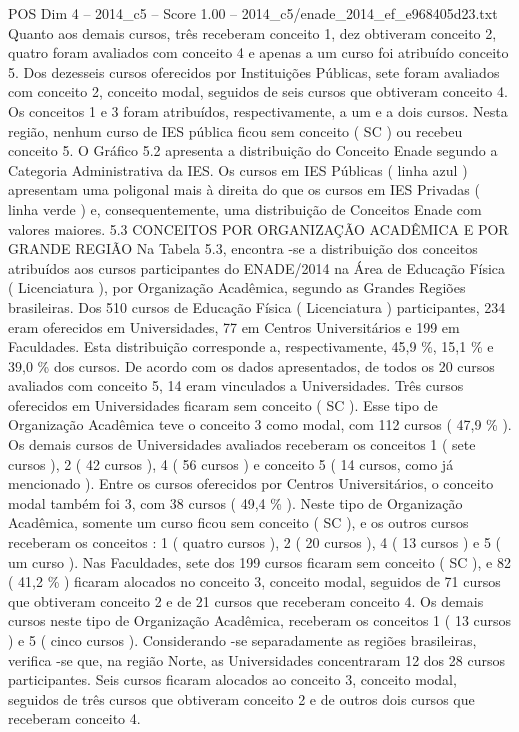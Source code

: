 \begin{textsample}{POS Dim 4 – 2014\_c5 – Score 1.00 – 2014\_c5/enade\_2014\_ef\_e968405d23.txt}
Quanto aos demais cursos, três receberam conceito 1, dez obtiveram conceito 2, quatro foram avaliados com conceito 4 e apenas a um curso foi atribuído conceito 5.
Dos dezesseis cursos oferecidos por Instituições Públicas, sete foram avaliados com conceito 2, conceito modal, seguidos de seis cursos que obtiveram conceito 4.
Os conceitos 1 e 3 foram atribuídos, respectivamente, a um e a dois cursos.
Nesta região, nenhum curso de IES pública ficou sem conceito ( SC ) ou recebeu conceito 5.
O Gráfico 5.2 apresenta a distribuição do Conceito Enade segundo a Categoria Administrativa da IES.
Os cursos em IES Públicas ( linha azul ) apresentam uma poligonal mais à direita do que os cursos em IES Privadas ( linha verde ) e, consequentemente, uma distribuição de Conceitos Enade com valores maiores. 5.3 CONCEITOS POR ORGANIZAÇÃO ACADÊMICA E POR GRANDE REGIÃO Na Tabela 5.3, encontra -se a distribuição dos conceitos atribuídos aos cursos participantes do ENADE/2014 na Área de Educação Física ( Licenciatura ), por Organização Acadêmica, segundo as Grandes Regiões brasileiras.
Dos 510 cursos de Educação Física ( Licenciatura ) participantes, 234 eram oferecidos em Universidades, 77 em Centros Universitários e 199 em Faculdades.
Esta distribuição corresponde a, respectivamente, 45,9 \%, 15,1 \% e 39,0 \% dos cursos.
De acordo com os dados apresentados, de todos os 20 cursos avaliados com conceito 5, 14 eram vinculados a Universidades.
Três cursos oferecidos em Universidades ficaram sem conceito ( SC ).
Esse tipo de Organização Acadêmica teve o conceito 3 como modal, com 112 cursos ( 47,9 \% ).
Os demais cursos de Universidades avaliados receberam os conceitos 1 ( sete cursos ), 2 ( 42 cursos ), 4 ( 56 cursos ) e conceito 5 ( 14 cursos, como já mencionado ).
Entre os cursos oferecidos por Centros Universitários, o conceito modal também foi 3, com 38 cursos ( 49,4 \% ).
Neste tipo de Organização Acadêmica, somente um curso ficou sem conceito ( SC ), e os outros cursos receberam os conceitos : 1 ( quatro cursos ), 2 ( 20 cursos ), 4 ( 13 cursos ) e 5 ( um curso ).
Nas Faculdades, sete dos 199 cursos ficaram sem conceito ( SC ), e 82 ( 41,2 \% ) ficaram alocados no conceito 3, conceito modal, seguidos de 71 cursos que obtiveram conceito 2 e de 21 cursos que receberam conceito 4.
Os demais cursos neste tipo de Organização Acadêmica, receberam os conceitos 1 ( 13 cursos ) e 5 ( cinco cursos ).
Considerando -se separadamente as regiões brasileiras, verifica -se que, na região Norte, as Universidades concentraram 12 dos 28 cursos participantes.
Seis cursos ficaram alocados ao conceito 3, conceito modal, seguidos de três cursos que obtiveram conceito 2 e de outros dois cursos que receberam conceito 4.

\end{textsample}
